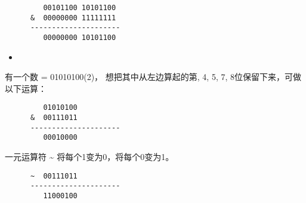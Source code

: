 \begin{frame}[fragile]
  \begin{li}
    \begin{lstlisting}
         00101100 10101100
      &  00000000 11111111
      ---------------------
         00000000 10101100
    \end{lstlisting}
  \end{li}
\end{frame}


\begin{frame}[fragile]

  \begin{itemize}
  \item {}
  \end{itemize}
  
  \begin{li}
    有一个数{ = 01010100(2)}， 想把其中从左边算起的第{, 4, 5, 7, 8}位保留下来，可做以下运算：
    \begin{lstlisting}
         01010100
      &  00111011
      ---------------------
         00010000
    \end{lstlisting}
  \end{li}
\end{frame}


\begin{frame}[fragile]
  一元运算符 {\tf \~{}} 将每个1变为0，将每个0变为1。
  \begin{li}
    \begin{lstlisting}
      ~  00111011
      ---------------------
         11000100
    \end{lstlisting}
  \end{li}
\end{frame}
